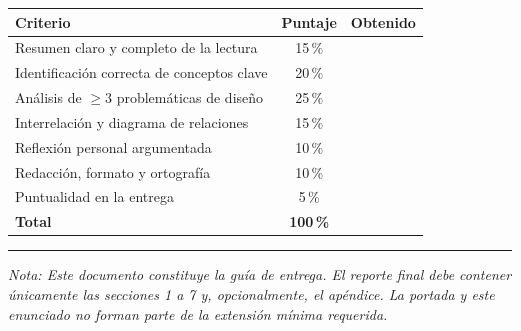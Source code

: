 \documentclass[12pt,a4paper]{article}
\begin{document}
\begin{table}[h]
    \centering
    \begin{tabular}{@{}p{7cm}cc@{}}
        \toprule
        \textbf{Criterio} & \textbf{Puntaje} & \textbf{Obtenido} \\
        \midrule
        Resumen claro y completo de la lectura & 15\,\% & \\
        Identificación correcta de conceptos clave & 20\,\% & \\
        Análisis de $\geq 3$ problemáticas de diseño & 25\,\% & \\
        Interrelación y diagrama de relaciones & 15\,\% & \\
        Reflexión personal argumentada & 10\,\% & \\
        Redacción, formato y ortografía & 10\,\% & \\
        Puntualidad en la entrega & 5\,\% & \\
        \midrule
        \textbf{Total} & \textbf{100\,\%} & \\
        \bottomrule
    \end{tabular}
\end{table}

\vspace{1.5cm}
\noindent\rule{\textwidth}{0.4pt}
\vspace{0.5cm}

\noindent\textit{Nota: Este documento constituye la guía de entrega. El reporte final debe contener únicamente las secciones 1 a 7 y, opcionalmente, el apéndice. La portada y este enunciado no forman parte de la extensión mínima requerida.}
\end{document}
